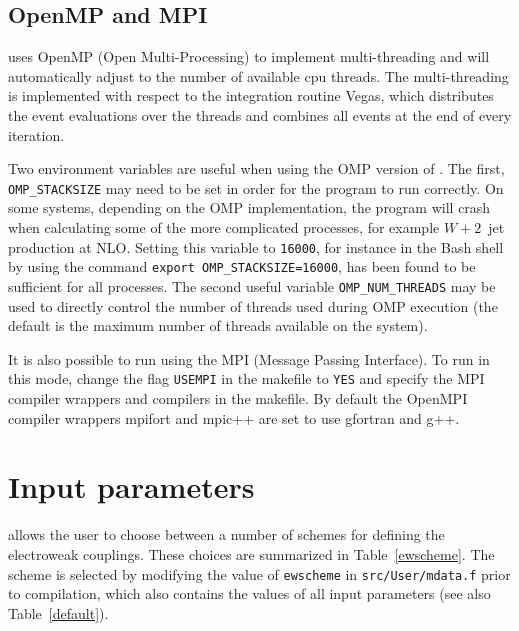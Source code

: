 \documentclass{article}
\begin{document}
\subsection{OpenMP and MPI}
\MCFM uses OpenMP (Open Multi-Processing) to implement multi-threading and will automatically adjust to the 
number of available cpu threads. The multi-threading is implemented with respect to the integration routine 
Vegas, which distributes the event evaluations over the threads and combines all events at the end of 
every iteration.

Two environment variables are useful when using the OMP version of \MCFM.
The first, {\tt OMP\_STACKSIZE} may need to be set in order for the program
to run correctly.  On some systems, depending on the OMP implementation,
the program will crash when calculating some of the more complicated processes,
for example $W+2$~jet production at NLO. Setting this
variable to {\tt 16000}, for instance in the Bash shell by using the
command {\tt export OMP\_STACKSIZE=16000}, has been found to be sufficient
for all processes.  The second useful variable {\tt OMP\_NUM\_THREADS}
may be used to directly control the number of threads used during
OMP execution (the default is the maximum number of threads available
on the system).

It is also possible to run \MCFM using the MPI (Message Passing Interface).
To run in this mode, change the flag {\tt USEMPI} in the makefile to {\tt YES} and specify the MPI compiler 
wrappers and compilers in the makefile. By default the OpenMPI compiler wrappers mpifort and mpic++ are set 
to use gfortran and g++.

 
\section{Input parameters}
\label{Input_parameters}
\MCFM allows the user to choose between a number of schemes
for defining the electroweak couplings. These choices are summarized
in Table~\ref{ewscheme}. The scheme is selected by modifying the
value of {\tt ewscheme} in {\tt src/User/mdata.f} prior to compilation, 
which also contains
the values of all input parameters (see also Table~\ref{default}).
\end{document}
